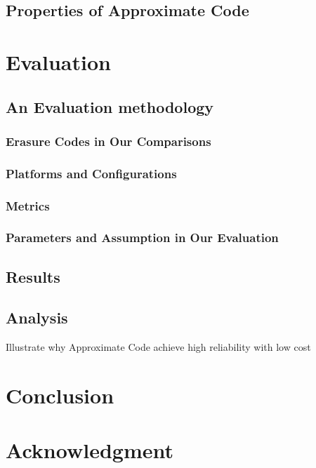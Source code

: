 \documentclass[conference]{IEEEtran}
\begin{document}
\subsection{Properties of Approximate Code}

\section{Evaluation}\label{evaluation}
\subsection{An Evaluation methodology}
\subsubsection{Erasure Codes in Our Comparisons}
\subsubsection{Platforms and Configurations}
\subsubsection{Metrics}
\subsubsection{Parameters and Assumption in Our Evaluation}


\subsection{Results}
\subsection{Analysis}
Illustrate why Approximate Code achieve high reliability with low cost
\section{Conclusion}
\section*{Acknowledgment}



\end{document}
